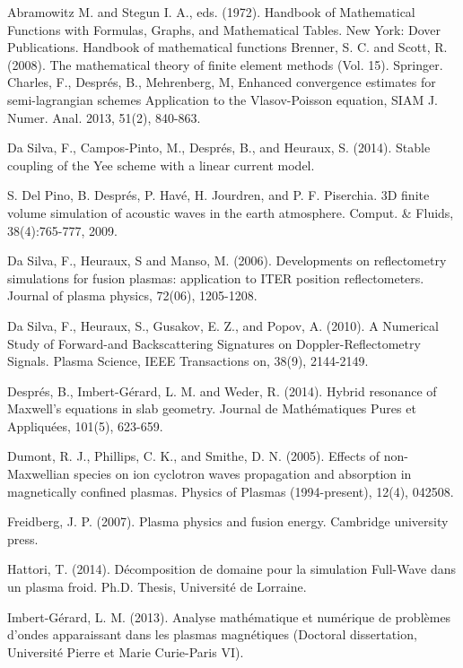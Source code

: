 \documentclass[proc]{edpsmath}
\begin{document}
\begin{thebibliography}{99}
	 Abramowitz M. and Stegun I. A., eds. (1972). Handbook of Mathematical Functions with Formulas, Graphs, and Mathematical Tables. New York: Dover Publications.
	Handbook of mathematical functions
	 Brenner, S. C. and Scott, R. (2008). The mathematical theory of finite element methods (Vol. 15). Springer.
Charles, F., Despr\'es, B., Mehrenberg, M, 
Enhanced convergence estimates for semi-lagrangian schemes Application to the Vlasov-Poisson equation, SIAM J. Numer. Anal. 2013, 51(2), 840-863.

 Da Silva, F., Campos-Pinto, M., Després, B., and Heuraux, S. (2014). Stable coupling of the Yee scheme with a linear current model.

S. Del Pino, B. Despr\'es, P. Hav\'e, H. Jourdren, and P. F. Piserchia. 3D finite
volume simulation of acoustic waves in the earth atmosphere.
Comput. \&
Fluids, 38(4):765-777, 2009.

 Da Silva, F., Heuraux, S and  Manso, M. (2006). Developments on reflectometry simulations for fusion plasmas: application to ITER position reflectometers. Journal of plasma physics, 72(06), 1205-1208.

Da Silva, F., Heuraux, S., Gusakov, E. Z., and Popov, A. (2010). A Numerical Study of Forward-and Backscattering Signatures on Doppler-Reflectometry Signals. Plasma Science, IEEE Transactions on, 38(9), 2144-2149.

 Després, B., Imbert-Gérard, L. M. and Weder, R. (2014). Hybrid resonance of Maxwell's equations in slab geometry. Journal de Mathématiques Pures et Appliquées, 101(5), 623-659.

 Dumont, R. J., Phillips, C. K., and Smithe, D. N. (2005). Effects of non-Maxwellian species on ion cyclotron waves propagation and absorption in magnetically confined plasmas. Physics of Plasmas (1994-present), 12(4), 042508.

 Freidberg, J. P. (2007). Plasma physics and fusion energy. Cambridge university press.


Hattori, T. (2014).
D\'ecomposition de domaine pour la simulation Full-Wave dans un plasma froid.
Ph.D. Thesis, Universit\'e de
Lorraine.

 Imbert-Gérard, L. M. (2013). Analyse mathématique et numérique de problèmes d'ondes apparaissant dans les plasmas magnétiques (Doctoral dissertation, Université Pierre et Marie Curie-Paris VI).





\end{thebibliography}
\end{document}
